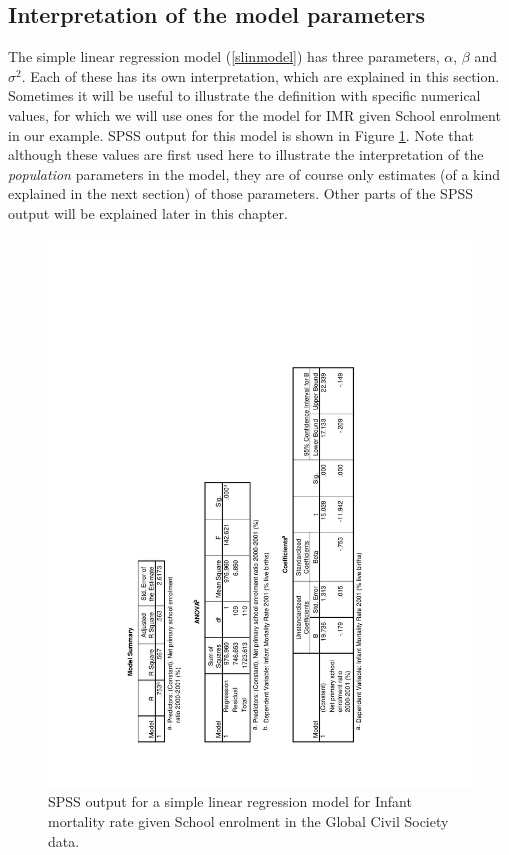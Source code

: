 \subsection{Interpretation of the model parameters}
\label{ss_regression_simple_int}

The simple linear regression model (\ref{slinmodel}) has three
parameters, $\alpha$, $\beta$ and $\sigma^{2}$. Each of these has its
own interpretation, which are explained in this section. Sometimes it
will be useful to illustrate the definition with specific numerical
values, for which we will use ones for the model for IMR
given School enrolment in our example. SPSS output for this model is
shown in Figure \ref{f_spss_linreg}. Note that although these values are
first used here to illustrate the interpretation of the \emph{population}
parameters in the model, they are of course only estimates (of a
kind explained in the next section) of those parameters. Other parts of
the SPSS output will be explained later in this chapter.

\begin{figure}[t]
\caption{SPSS output for a simple linear regression model for Infant
mortality rate given School enrolment in the Global Civil Society data.}
\label{f_spss_linreg}
\vspace*{-1ex}
\includegraphics[bb=100 90 470 590, angle=-90, width=144mm]{spsslinreg}
\vspace*{-2ex}
\end{figure}

